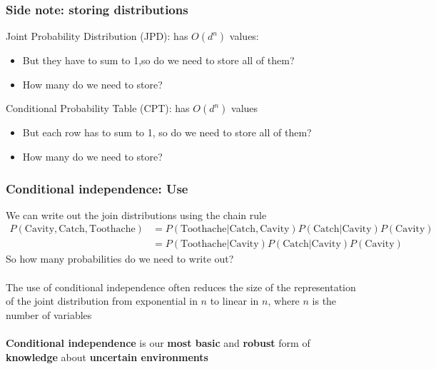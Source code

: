 \documentclass{article}
\begin{document}
\subsubsection*{Side note: storing distributions}
Joint Probability Distribution (JPD): has $ O(d^n) $ values:
\begin{itemize}
	\item  But they have to sum to 1,so do we need to store all of them? 
 \item How many do we need to store?
\end{itemize}
Conditional Probability Table (CPT): has $ O(d^n) $ values
\begin{itemize}
	\item But each row has to sum to 1, so do we need to store all of
them?
\item How many do we need to store?
\end{itemize}

\subsubsection*{Conditional independence: Use}
We can write out the join distributions using the chain rule
\begin{align*}
P(\text{Cavity}, \text{Catch} , \text{Toothache}) &= P(\text{Toothache} | \text{Catch}, \text{Cavity})P(\text{Catch} | \text{Cavity} )P(\text{Cavity} ) \\
&=  P(\text{Toothache} | \text{Cavity})P(\text{Catch} | \text{Cavity} )P(\text{Cavity} )
\end{align*}
So how many probabilities do we need to write out?\\
\\
The use of conditional independence often reduces the size of the representation of the joint distribution from exponential in $ n $ to linear in $ n $, where $ n $ is the number of variables\\
\\
\textbf{Conditional independence} is our \textbf{most basic} and \textbf{robust} form of \textbf{knowledge} about \textbf{uncertain environments}
\end{document}
